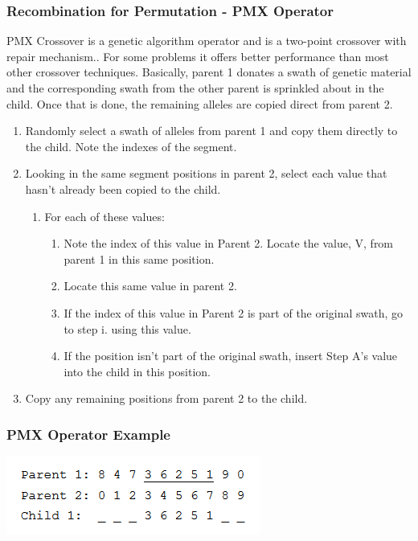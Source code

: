 \documentclass[11pt]{article}
\begin{document}
\subsubsection{Recombination for Permutation - PMX Operator}
PMX Crossover is a genetic algorithm operator and is a two-point crossover with repair mechanism.. For some problems it offers better performance than most other crossover techniques. Basically, parent 1 donates a swath of genetic material and the corresponding swath from the other parent is sprinkled about in the child. Once that is done, the remaining alleles are copied direct from parent 2.

\begin{enumerate}
	\item Randomly select a swath of alleles from parent 1 and copy them directly to the child. Note the indexes of the segment.
	\item Looking in the same segment positions in parent 2, select each value that hasn't already been copied to the child.
	\begin{enumerate}[label=\Alph*.]
		\item For each of these values:
		\begin{enumerate}[label=\roman*.]
			\item Note the index of this value in Parent 2. Locate the value, V, from parent 1 in this same position.
			\item Locate this same value in parent 2.
			\item If the index of this value in Parent 2 is part of the original swath, go to step i. using this value.
			\item If the position isn't part of the original swath, insert Step A's value into the child in this position.
		\end{enumerate}
	\end{enumerate}
	\item Copy any remaining positions from parent 2 to the child.
\end{enumerate}

\subsubsection{PMX Operator Example}
\includegraphics[width=0.4\linewidth]{img/pmx_example_01}
\end{document}
